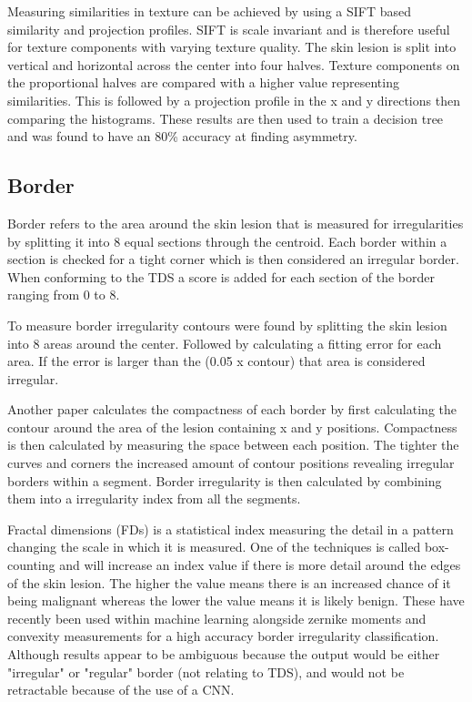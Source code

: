 \documentclass[12pt]{report}
\begin{document}
Measuring similarities in texture can be achieved by using a SIFT based similarity and projection profiles\cite{Ali2020a}. SIFT is scale invariant and is therefore useful for texture components with varying texture quality. The skin lesion is split into vertical and horizontal across the center into four halves. Texture components on the proportional halves are compared with a higher value representing similarities. This is followed by a projection profile in the x and y directions then comparing the histograms. These results are then used to train a decision tree and was found to have an 80\% accuracy at finding asymmetry.

\subsection{Border}
Border refers to the area around the skin lesion that is measured for irregularities by splitting it into 8 equal sections through the centroid. Each border within a section is checked for a tight corner which is then considered an irregular border. When conforming to the TDS a score is added for each section of the border ranging from 0 to 8.

To measure border irregularity contours were found by splitting the skin lesion into 8 areas around the center. Followed by calculating a fitting error  for each area. If the error is larger than the (0.05 x contour) that area is considered irregular\cite{Kasmi2016a}.

Another paper calculates the compactness of each border by first calculating the contour around the area of the lesion containing x and y positions. Compactness is then calculated by measuring the space between each position. The tighter the curves and corners the increased amount of contour positions revealing irregular borders within a segment. Border irregularity is then calculated by combining them into a irregularity index from all the segments\cite{Zaqout2019a}.

Fractal dimensions (FDs) is a statistical index measuring the detail in a pattern changing the scale in which it is measured. One of the techniques is called box-counting and will increase an index value if there is more detail around the edges of the skin lesion. The higher the value means there is an increased chance of it being malignant whereas the lower the value means it is likely benign. These have recently been used within machine learning alongside zernike moments and convexity measurements for a high accuracy border irregularity classification\cite{Ali2020b}. Although results appear to be ambiguous because the output would be either "irregular" or "regular" border (not relating to TDS), and would not be retractable because of the use of a CNN.
\end{document}
